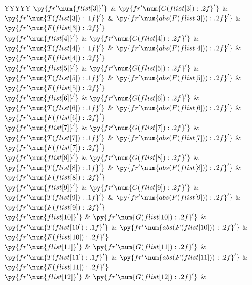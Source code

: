 \documentclass[../main/main.tex]{subfiles}
\begin{document}
{\begin{center}
\begin{tabularx}{\linewidth}{YYYYY}
			$\py{fr'\num{{{flist[3]}}}'}$              &
			$\py{fr'\num{{{G(flist[3]):.2f}}}'}$       &
			$\py{fr'\num{{{T(flist[3]):.1f}}}'}$       &
			$\py{fr'\num{{{abs(F(flist[3])):.2f}}}'}$  &
			$\py{fr'\num{{{F(flist[3]):.2f}}}'}$
			\\
			$\py{fr'\num{{{flist[4]}}}'}$              &
			$\py{fr'\num{{{G(flist[4]):.2f}}}'}$       &
			$\py{fr'\num{{{T(flist[4]):.1f}}}'}$       &
			$\py{fr'\num{{{abs(F(flist[4])):.2f}}}'}$  &
			$\py{fr'\num{{{F(flist[4]):.2f}}}'}$
			\\
			$\py{fr'\num{{{flist[5]}}}'}$              &
			$\py{fr'\num{{{G(flist[5]):.2f}}}'}$       &
			$\py{fr'\num{{{T(flist[5]):.1f}}}'}$       &
			$\py{fr'\num{{{abs(F(flist[5])):.2f}}}'}$  &
			$\py{fr'\num{{{F(flist[5]):.2f}}}'}$
			\\
			$\py{fr'\num{{{flist[6]}}}'}$              &
			$\py{fr'\num{{{G(flist[6]):.2f}}}'}$       &
			$\py{fr'\num{{{T(flist[6]):.1f}}}'}$       &
			$\py{fr'\num{{{abs(F(flist[6])):.2f}}}'}$  &
			$\py{fr'\num{{{F(flist[6]):.2f}}}'}$
			\\
			$\py{fr'\num{{{flist[7]}}}'}$              &
			$\py{fr'\num{{{G(flist[7]):.2f}}}'}$       &
			$\py{fr'\num{{{T(flist[7]):.1f}}}'}$       &
			$\py{fr'\num{{{abs(F(flist[7])):.2f}}}'}$  &
			$\py{fr'\num{{{F(flist[7]):.2f}}}'}$
			\\
			$\py{fr'\num{{{flist[8]}}}'}$              &
			$\py{fr'\num{{{G(flist[8]):.2f}}}'}$       &
			$\py{fr'\num{{{T(flist[8]):.1f}}}'}$       &
			$\py{fr'\num{{{abs(F(flist[8])):.2f}}}'}$  &
			$\py{fr'\num{{{F(flist[8]):.2f}}}'}$
			\\
			$\py{fr'\num{{{flist[9]}}}'}$              &
			$\py{fr'\num{{{G(flist[9]):.2f}}}'}$       &
			$\py{fr'\num{{{T(flist[9]):.1f}}}'}$       &
			$\py{fr'\num{{{abs(F(flist[9])):.2f}}}'}$  &
			$\py{fr'\num{{{F(flist[9]):.2f}}}'}$
			\\
			$\py{fr'\num{{{flist[10]}}}'}$             &
			$\py{fr'\num{{{G(flist[10]):.2f}}}'}$      &
			$\py{fr'\num{{{T(flist[10]):.1f}}}'}$      &
			$\py{fr'\num{{{abs(F(flist[10])):.2f}}}'}$ &
			$\py{fr'\num{{{F(flist[10]):.2f}}}'}$
			\\
			$\py{fr'\num{{{flist[11]}}}'}$             &
			$\py{fr'\num{{{G(flist[11]):.2f}}}'}$      &
			$\py{fr'\num{{{T(flist[11]):.1f}}}'}$      &
			$\py{fr'\num{{{abs(F(flist[11])):.2f}}}'}$ &
			$\py{fr'\num{{{F(flist[11]):.2f}}}'}$
			\\
			$\py{fr'\num{{{flist[12]}}}'}$             &
			$\py{fr'\num{{{G(flist[12]):.2f}}}'}$      &

\end{tabularx}
\end{center}}
\end{document}
